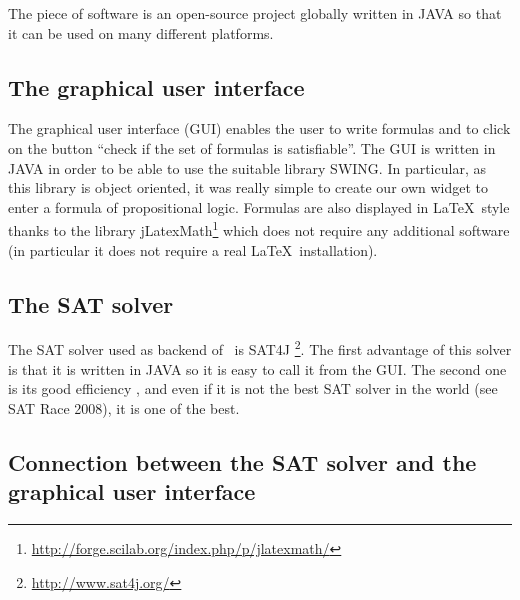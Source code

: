 The piece of software \satoulouse is an open-source project globally written in
JAVA so that it can be used on many different platforms.

\subsection{The graphical user interface}


The graphical user interface (GUI) enables the user to write formulas and to
click on the button ``check if the set of formulas is satisfiable''. The GUI
is written in JAVA in order to be able to use the suitable library SWING. In
particular, as this library is object oriented, it was really simple to create
our own widget to enter a formula of propositional logic. Formulas are also
displayed in \LaTeX\ style thanks to the library jLatexMath\footnote{\url{http://forge.scilab.org/index.php/p/jlatexmath/}} which does not require any
additional software (in particular it does not require a real \LaTeX\
installation).


\subsection{The SAT solver}

The SAT solver used as backend of \satoulouse\ is SAT4J
\footnote{\url{http://www.sat4j.org/}}. The first advantage of this solver is
that it is written in JAVA so it is easy to call it from the GUI. The second
one is its good efficiency \cite{berre10:_sat4j}, and even if it is not the best SAT
solver in the world (see SAT Race 2008), it is one of the best. 


\subsection{Connection between the SAT solver and the graphical user interface}

